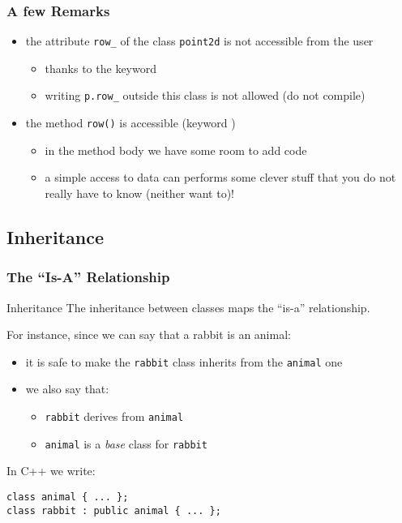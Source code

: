 \documentclass{beamer}
\newcommand{\cpp}{{C++}\xspace}
\newcommand{\kw}[1]{{\color{blue}{\texttt{#1}}}\xspace}
\newcommand{\code}[1]{{\scriptsize{\texttt{#1}}}\xspace}
\begin{document}
\begin{frame}[fragile]
  \frametitle{A few Remarks}

  \begin{itemize}
  \item the attribute \code{row\_} of the class \code{point2d} is not
    accessible from the user
    \begin{itemize}
    \item thanks to the keyword \kw{private}
    \item writing \code{p.row\_} outside this class is not allowed (do
      not compile)
    \end{itemize}
    \smallskip
  \item the method \code{row()} is accessible (keyword \kw{public})
    \begin{itemize}
    \item in the method body we have some room to add code
    \item a simple access to data can performs some clever stuff that
      you do not really have to know (neither want to)!
    \end{itemize}
  \end{itemize}

\end{frame}




\subsection{Inheritance}


\begin{frame}[fragile]
  \frametitle{The ``Is-A'' Relationship}

  \begin{block}{Inheritance}
    The inheritance between classes maps the ``is-a'' relationship.
  \end{block}

For instance, since we can say that a rabbit is an animal:
\begin{itemize}
\item it is safe to make the \code{rabbit} class inherits from the
  \code{animal} one
\item we also say that:
  \begin{itemize}
  \item \code{rabbit} derives from \code{animal}
  \item \code{animal} is a \emph{base} class for \code{rabbit}
  \end{itemize}
\end{itemize}

In \cpp we write:
\begin{lstlisting}
class animal { ... };
class rabbit : public animal { ... };
\end{lstlisting}

\end{frame}
\end{document}
